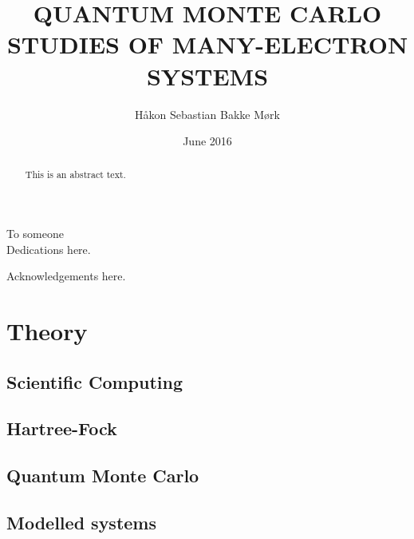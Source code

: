\documentclass[twoside,english]{uiofysmaster}
\numberwithin{equation}{section} %
\begin{document}
	\author{H\aa kon Sebastian Bakke M\o rk}
	\title{\uppercase{Quantum Monte Carlo studies of Many-Electron systems}}
	\date{June 2016}

	\maketitle

	\begin{abstract}
	This is an abstract text.
	\end{abstract}

	\begin{dedication}
	  To someone
	  \\\vspace{12pt}
	  Dedications here.
	\end{dedication}

	\begin{acknowledgements}
	  Acknowledgements here.
	\end{acknowledgements}

	\tableofcontents{}





	

	\part{Theory}
		\chapter{Scientific Computing}
			
		\chapter{Hartree-Fock}
			
			
		\chapter{Quantum Monte Carlo}
			
			
			
			
			
			
			
		\chapter{Modelled systems}
			
			
			
%			
\end{document}
